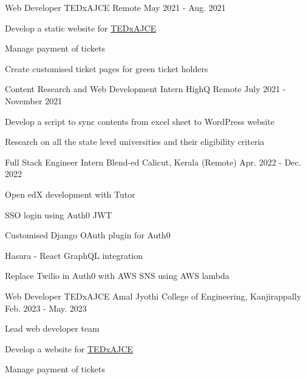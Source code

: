 
\begin{cventries}
  \cventry
    {Web Developer} %
    {TEDxAJCE} %
    {Remote}
    {May 2021 - Aug. 2021} %
    {
      \begin{cvitems} %
        \item Develop a static website for \hyperlink{https://www.tedxajce.in/tedx2021}{TEDxAJCE}
        \item Manage payment of tickets
        \item Create customised ticket pages for green ticket holders
      \end{cvitems}
    }

  \cventry
    {Content Research and Web Development Intern} %
    {HighQ} %
    {Remote} %
    {July 2021 - November 2021} %
    {
      \begin{cvitems} %
        \item Develop a script to sync contents from excel sheet to WordPress website
        \item Research on all the state level universities and their eligibility criteria
      \end{cvitems}
    }

  \cventry
    {Full Stack Engineer Intern} %
    {Blend-ed} %
    {Calicut, Kerala (Remote)   } %
    {Apr. 2022 - Dec. 2022} %
    {
      \begin{cvitems} %
        \item Open edX development with Tutor
        \item SSO login using Auth0 JWT
        \item Customised Django OAuth plugin for Auth0
        \item Hasura - React GraphQL integration
        \item Replace Twilio in Auth0 with AWS SNS using AWS lambda
      \end{cvitems}
    }

  \cventry
    {Web Developer} %
    {TEDxAJCE} %
    {Amal Jyothi College of Engineering, Kanjirappally}
    {Feb. 2023 - May. 2023} %
    {
      \begin{cvitems} %
        \item Lead web developer team
        \item Develop a website for \hyperlink{https://www.tedxajce.in/tedx2023}{TEDxAJCE}
        \item Manage payment of tickets
      \end{cvitems}
    }


\end{cventries}
